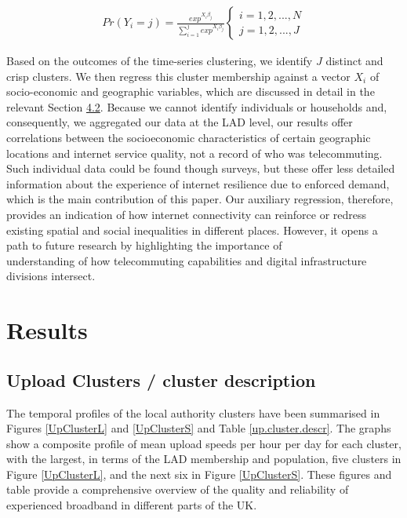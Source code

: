 \documentclass[Royal,times,sageh]{sagej}
\begin{document}
\begin{align}
Pr(Y_{i}=j) = \frac{exp^{X_{i}\beta_{j}}}{\sum_{i=1}^j exp^{X_{i}\beta_{j}}}
\begin{cases}
    i = 1, 2, ... , N \\  
    j = 1, 2, ... , J
\end{cases}\label{eq1}
\end{align}

Based on the outcomes of the time-series clustering, we identify \(J\)
distinct and crisp clusters. We then regress this cluster membership
against a vector \(X_{i}\) of socio-economic and geographic variables,
which are discussed in detail in the relevant Section
\protect\hyperlink{sec:4.2}{4.2}. Because we cannot identify individuals
or households and, consequently, we aggregated our data at the LAD
level, our results offer correlations between the socioeconomic
characteristics of certain geographic locations and internet service
quality, not a record of who was telecommuting. Such individual data
could be found though surveys, but these offer less detailed information
about the experience of internet resilience due to enforced demand,
which is the main contribution of this paper. Our auxiliary regression,
therefore, provides an indication of how internet connectivity can
reinforce or redress existing spatial and social inequalities in
different places. However, it opens a path to future research by
highlighting the importance of\\
understanding of how telecommuting capabilities and digital
infrastructure divisions intersect.

\hypertarget{sec:4}{%
\section{Results}\label{sec:4}}

\hypertarget{sec:4.1}{%
\subsection{Upload Clusters / cluster description}\label{sec:4.1}}

The temporal profiles of the local authority clusters have been
summarised in Figures \ref{UpClusterL} and \ref{UpClusterS} and Table
\ref{up.cluster.descr}. The graphs show a composite profile of mean
upload speeds per hour per day for each cluster, with the largest, in
terms of the LAD membership and population, five clusters in Figure
\ref{UpClusterL}, and the next six in Figure \ref{UpClusterS}. These
figures and table provide a comprehensive overview of the quality and
reliability of experienced broadband in different parts of the UK.
\end{document}
